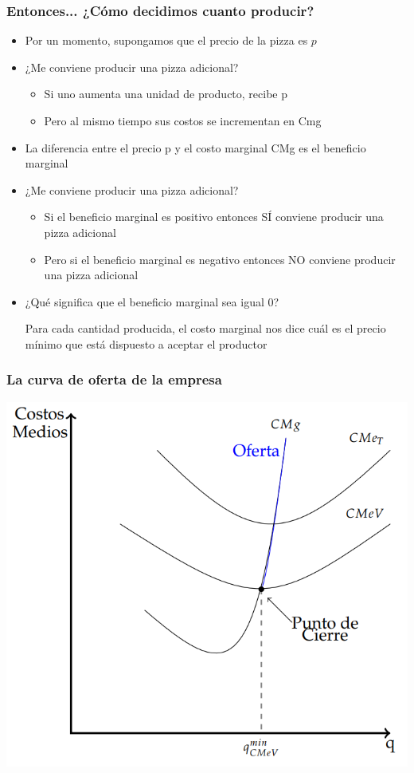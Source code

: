 \documentclass{beamer}
\begin{document}
\begin{frame}
\frametitle{Entonces... ¿Cómo decidimos cuanto producir?}
    \begin{itemize}
        \item Por un momento, supongamos que el precio de la pizza es $p$
            \item ¿Me conviene producir una pizza adicional?     
        \begin{itemize}
            \item Si uno aumenta una unidad de producto, recibe p
            \item Pero al mismo tiempo sus costos se incrementan en Cmg
        \end{itemize}
        \item La diferencia entre el precio p y el costo marginal CMg es el beneficio marginal
        \item ¿Me conviene producir una pizza adicional?
        \begin{itemize}
            \item Si el beneficio marginal es positivo entonces SÍ conviene producir una pizza adicional
            \item Pero si el beneficio marginal es negativo entonces NO conviene producir una pizza adicional
        \end{itemize} 
        \item ¿Qué significa que el beneficio marginal sea igual 0?
        \begin{boxA}
            \centering
            Para cada cantidad producida, el costo marginal nos dice cuál es el precio mínimo que está dispuesto a aceptar el productor
        \end{boxA}
    \end{itemize}
\end{frame}



\begin{frame}
\frametitle{La curva de oferta de la empresa}
\centering
\includegraphics[scale=0.5]{../Figures/C13.11.png}
\end{frame}
\end{document}
